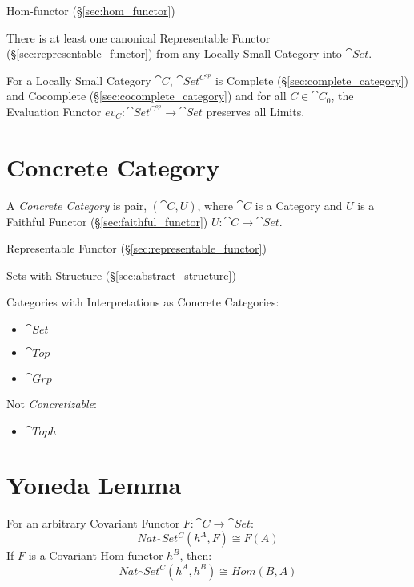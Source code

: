 Hom-functor (\S\ref{sec:hom_functor})

There is at least one canonical Representable Functor
(\S\ref{sec:representable_functor}) from any Locally Small Category
into $\cat{Set}$.

For a Locally Small Category $\cat{C}$, $\cat{Set^{C^{op}}}$ is
Complete (\S\ref{sec:complete_category}) and Cocomplete
(\S\ref{sec:cocomplete_category}) and for all $C \in \cat{C}_0$,
the Evaluation Functor $ev_C : \cat{Set^{C^{op}}} \rightarrow
\cat{Set}$ preserves all Limits. \cite{awodey06}



\section{Concrete Category}\label{sec:concrete_category}

A \emph{Concrete Category} is pair, $(\cat{C},U)$, where $\cat{C}$ is
a Category and $U$ is a Faithful Functor
(\S\ref{sec:faithful_functor}) $U : \cat{C} \rightarrow \cat{Set}$.

Representable Functor (\S\ref{sec:representable_functor})

Sets with Structure (\S\ref{sec:abstract_structure})

Categories with Interpretations as Concrete Categories:
\begin{itemize}
  \item $\cat{Set}$
  \item $\cat{Top}$
  \item $\cat{Grp}$
\end{itemize}

Not \emph{Concretizable}:
\begin{itemize}
  \item $\cat{Toph}$
\end{itemize}



\section{Yoneda Lemma}\label{sec:yoneda_lemma}

For an arbitrary Covariant Functor $F : \cat{C} \rightarrow
\cat{Set}$:
\[
  Nat_\cat{Set^C}(h^A,F) \cong F(A)
\]
If $F$ is a Covariant Hom-functor $h^B$, then:
\[
  Nat_\cat{Set^C}(h^A,h^B) \cong Hom(B,A)
\]

